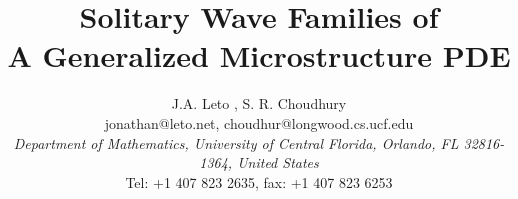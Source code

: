 \documentclass{article}
\numberwithin{equation}{section}
\begin{document}
\author{ J.A. Leto , S. R. Choudhury \\
\small{jonathan@leto.net, choudhur@longwood.cs.ucf.edu} \\
\emph{\small{Department of Mathematics, University of Central Florida, Orlando, FL 32816-1364, United States}}\\
\small{Tel: +1 407 823 2635, fax: +1 407 823 6253 } }

\title{ Solitary Wave Families of \\ A Generalized Microstructure PDE }
\date{}
\maketitle










\end{document}
